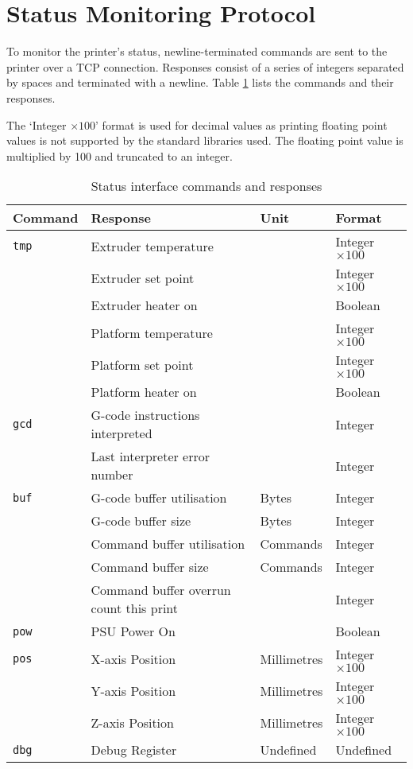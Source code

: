 	\section{Status Monitoring Protocol}
		
		\label{sec:statusSpec}
		
		To monitor the printer's status, newline-terminated commands are sent to the
		printer over a TCP connection. Responses consist of a series of integers
		separated by spaces and terminated with a newline. Table
		\ref{tab:statuscmds} lists the commands and their responses.
		
		The `Integer $\times100$' format is used for decimal values as printing
		floating point values is not supported by the standard libraries used. The
		floating point value is multiplied by 100 and truncated to an integer.
		
		\begin{table}
			\centering
			\begin{tabular}{l l l l}
				\toprule
				Command & Response & Unit & Format \\
				\midrule
				\verb|tmp| & Extruder temperature & \dC & Integer $\times100$ \\
				           & Extruder set point   & \dC & Integer $\times100$ \\
				           & Extruder heater on   &     & Boolean \\
				           & Platform temperature & \dC & Integer $\times100$ \\
				           & Platform set point   & \dC & Integer $\times100$ \\
				           & Platform heater on   &     & Boolean \\
				\addlinespace
				\verb|gcd| & G-code instructions interpreted & & Integer \\
				           & Last interpreter error number &  & Integer \\
				\addlinespace
				\verb|buf| & G-code buffer utilisation & Bytes & Integer \\
				           & G-code buffer size & Bytes & Integer \\
				           & Command buffer utilisation & Commands & Integer \\
				           & Command buffer size & Commands & Integer \\
				           & Command buffer overrun count this print & & Integer \\
				\addlinespace
				\verb|pow| & PSU Power On & & Boolean \\
				\addlinespace
				\verb|pos| & X-axis Position & Millimetres & Integer $\times100$ \\
				           & Y-axis Position & Millimetres & Integer $\times100$ \\
				           & Z-axis Position & Millimetres & Integer $\times100$ \\
				\addlinespace
				\verb|dbg| & Debug Register & Undefined & Undefined \\
				\bottomrule
			\end{tabular}
			
			\caption{Status interface commands and responses}
			\label{tab:statuscmds}
		\end{table}
